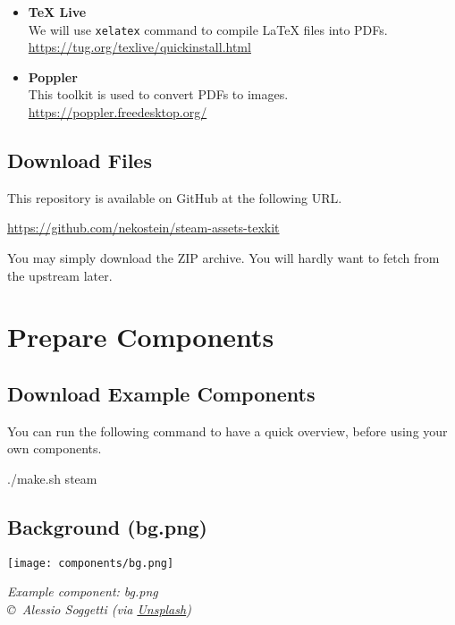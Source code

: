 \documentclass[11pt,a4paper]{report}
\providecommand{\colorhref}[2]{\textcolor{black!20!blue!80!green}{\href{#1}{#2}}}
\begin{document}
\begin{itemize}
	\item \textbf{TeX Live}\\
	      We will use \texttt{xelatex} command to compile LaTeX files into PDFs.\\
	      \colorhref{https://tug.org/texlive/quickinstall.html}{https://tug.org/texlive/quickinstall.html}

	\item \textbf{Poppler}\\
	      This toolkit is used to convert PDFs to images.\\
	      \colorhref{https://poppler.freedesktop.org/}{https://poppler.freedesktop.org/}
\end{itemize}

\section{Download Files}

This repository is available on GitHub at the following URL.

\begin{center}
	\colorhref{https://github.com/nekostein/steam-assets-texkit}{https://github.com/nekostein/steam-assets-texkit}
\end{center}

You may simply download the ZIP archive. You will hardly want to fetch from the upstream later.



\chapter{Prepare Components}

\section{Download Example Components}
You can run the following command to have a quick overview, before using your own components.

\begin{center}
	\ttfamily ./make.sh steam
\end{center}

\section{Background (bg.png)}
\begin{minipage}{\linewidth}
	\center\sffamily
	\texttt{[image: components/bg.png]}\par
	\small\itshape
	Example component: bg.png\\
	\copyright~Alessio Soggetti (via \colorhref{https://unsplash.com/photos/view-of-mountain-PdGBci-4jR8}{Unsplash})
\end{minipage}
\end{document}
